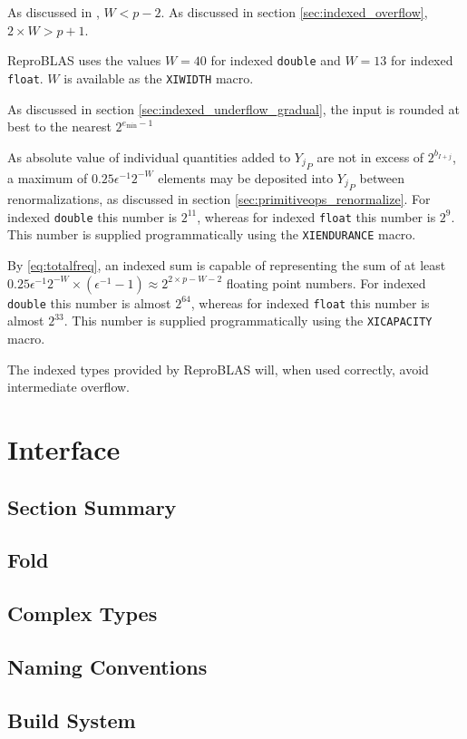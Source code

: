 \documentclass[12pt]{article}
\providecommand{\min}{\ensuremath{\text{min}}}
\theoremstyle{definition}
\numberwithin{equation}{section}
\numberwithin{figure}{section}
\begin{document}
    As discussed in \cite{repsum}, $W < p - 2$. As discussed in section \ref{sec:indexed_overflow}, $2\times W > p + 1$.

    ReproBLAS uses the values $W = 40$ for indexed \texttt{double} and $W = 13$ for indexed \texttt{float}. $W$ is available as the \texttt{XIWIDTH} macro.

    As discussed in section \ref{sec:indexed_underflow_gradual}, the input is rounded at best to the nearest $2^{e_{\min} - 1}$

    As absolute value of individual quantities added to ${Y_j}_P$ are not in excess of $2^{b_{I + j}}$, a maximum of $0.25\epsilon^{-1}2^{-W}$ elements may be deposited into ${Y_j}_P$ between renormalizations, as discussed in section \ref{sec:primitiveops_renormalize}. For indexed \texttt{double} this number is $2^{11}$, whereas for indexed \texttt{float} this number is $2^9$. This number is supplied programmatically using the \texttt{XIENDURANCE} macro.

    By \eqref{eq:totalfreq}, an indexed sum is capable of representing the sum of at least $0.25\epsilon^{-1}2^{-W} \times (\epsilon^{-1} - 1) \approx 2^{2 \times p - W - 2}$ floating point numbers. For indexed \texttt{double} this number is almost $2^{64}$, whereas for indexed \texttt{float} this number is almost $2^{33}$. This number is supplied programmatically using the \texttt{XICAPACITY} macro.

    The indexed types provided by ReproBLAS will, when used correctly, avoid intermediate overflow.

\section{Interface}
  \subsection{Section Summary}
  \subsection{Fold}
  \subsection{Complex Types}
  \subsection{Naming Conventions}
  \subsection{Build System}
\end{document}
